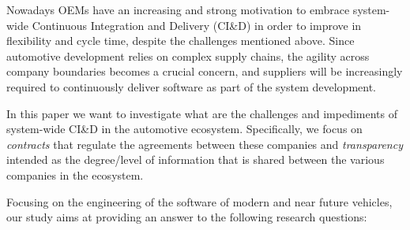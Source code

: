 Nowadays OEMs have an increasing and strong motivation
to embrace system-wide Continuous Integration and Delivery (CI\&D) in order to improve
in flexibility and cycle time, despite the challenges mentioned above. 
Since automotive development relies on complex supply chains, the agility across company boundaries becomes a crucial concern, and suppliers will be increasingly required to continuously deliver software as part of the system development.

In this paper we want to investigate %
what are the challenges and impediments of system-wide CI\&D in the automotive ecosystem. 
Specifically, we focus on {\em contracts} that regulate the agreements between these companies 
and {\em transparency} intended as the degree/level of information that is shared between the various companies in the ecosystem. 

Focusing on the engineering of the software of modern and near future vehicles, our study aims at providing an answer to the following research questions:

%

